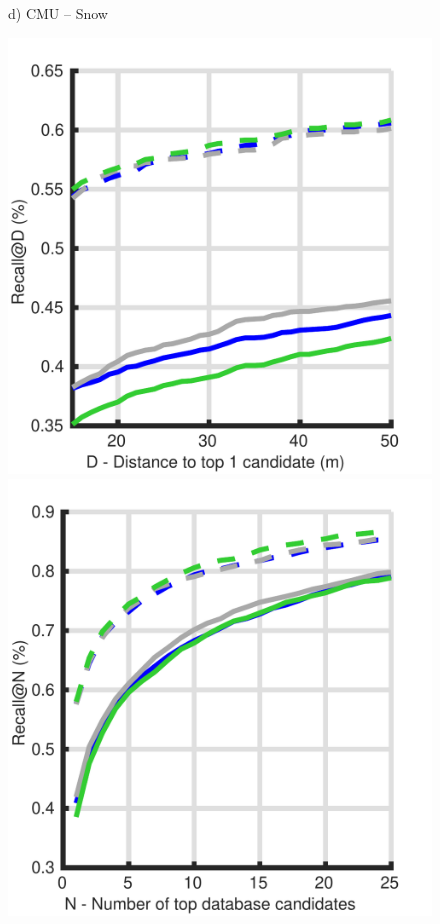 \begin{figure}
\begin{minipage}{0.27\linewidth}
		d) CMU -- Snow
	\end{minipage}
	\begin{minipage}{0.27\linewidth}
		\center \scriptsize
		\includegraphics[width=\linewidth]{plot/depth_vs_ref/Results_cmu_autumn/distance}	
		
		\includegraphics[width=\linewidth]{plot/depth_vs_ref/Results_cmu_autumn/recall}
		

\end{minipage}
\end{figure}
